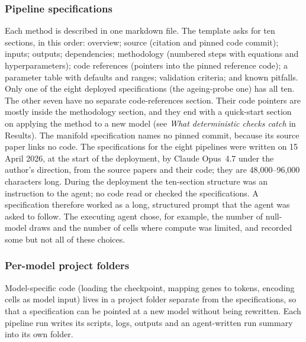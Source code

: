 \subsubsection*{Pipeline specifications}
Each method is described in one markdown file. The template asks for
ten sections, in this order: overview; source (citation and pinned code
commit); inputs; outputs; dependencies; methodology (numbered steps with
equations and hyperparameters); code references (pointers into the pinned
reference code); a parameter table with defaults and ranges; validation
criteria; and known pitfalls. Only one of the eight deployed
specifications (the ageing-probe one) has all ten. The other seven have
no separate code-references section. Their code pointers are mostly inside
the methodology section, and they end with a quick-start section on
applying the method to a new model (see \emph{What deterministic checks
catch} in Results). The manifold specification names no pinned commit,
because its source paper links no code. The specifications for the eight
pipelines were written on 15 April 2026, at the start of the deployment,
by Claude Opus~4.7 under the author's direction, from the source papers
and their code; they are 48,000--96,000 characters long. During the deployment the ten-section
structure was an instruction to the agent; no code read or checked the
specifications. A specification therefore worked as a long, structured
prompt that the agent was asked to follow. The executing agent chose, for
example, the number of null-model draws and the number of cells where
compute was limited, and recorded some but not all of these choices.

\subsubsection*{Per-model project folders}
Model-specific code (loading the checkpoint, mapping genes to tokens,
encoding cells as model input) lives in a project folder separate from the
specifications, so that a specification can be pointed at a new model
without being rewritten. Each pipeline run writes its scripts, logs,
outputs and an agent-written run summary into its own folder.

